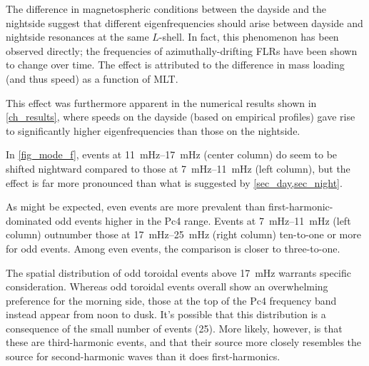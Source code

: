 The difference in magnetospheric conditions between the dayside and the nightside suggest that different eigenfrequencies should arise between dayside and nightside resonances at the same $L$-shell. In fact, this phenomenon has been observed directly; the frequencies of azimuthally-drifting FLRs have been shown to change over time\cite{motoba_2015}. The effect is attributed to the difference in mass loading (and thus \Alfven speed) as a function of MLT. 

This effect was furthermore apparent in the numerical results shown in \cref{ch_results}, where \Alfven speeds on the dayside (based on empirical profiles) gave rise to significantly higher eigenfrequencies than those on the nightside. 

In \cref{fig_mode_f}, events at \SIrange{11}{17}{\mHz} (center column) do seem to be shifted nightward compared to those at \SIrange{7}{11}{\mHz} (left column), but the effect is far more pronounced than what is suggested by \cref{sec_day,sec_night}. 


As might be expected, even events are more prevalent than first-harmonic-dominated odd events higher in the Pc4 range. Events at \SIrange{7}{11}{\mHz} (left column) outnumber those at \SIrange{17}{25}{\mHz} (right column) ten-to-one or more for odd events. Among even events, the comparison is closer to three-to-one. 

The spatial distribution of odd toroidal events above \SI{17}{\mHz} warrants specific consideration. Whereas odd toroidal events overall show an overwhelming preference for the morning side, those at the top of the Pc4 frequency band instead appear from noon to dusk. It's possible that this distribution is a consequence of the small number of events (25). More likely, however, is that these are third-harmonic events, and that their source more closely resembles the source for second-harmonic waves than it does first-harmonics. 


